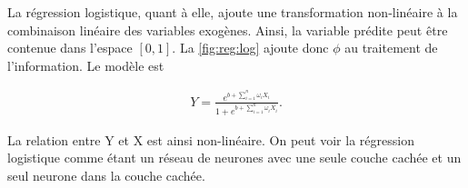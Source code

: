 \begin{figure}[h]
\end{figure}

La régression logistique, quant à elle, ajoute une transformation non-linéaire à la combinaison linéaire des variables exogènes. Ainsi, la variable prédite peut être contenue dans l'espace $[0,1]$. La \autoref{fig:reg:log} ajoute donc $\phi$ au traitement de l'information. Le modèle est

\begin{align*}
Y = \frac{e^{b+ \sum_{i=1}^n \omega_{i} X_i}}{1+e^{b+ \sum_{i=1}^n \omega_{i} X_i}}.
\end{align*}

La relation entre Y et X est ainsi non-linéaire. On peut voir la régression logistique comme étant un réseau de neurones avec une seule couche cachée et un seul neurone dans la couche cachée. 


